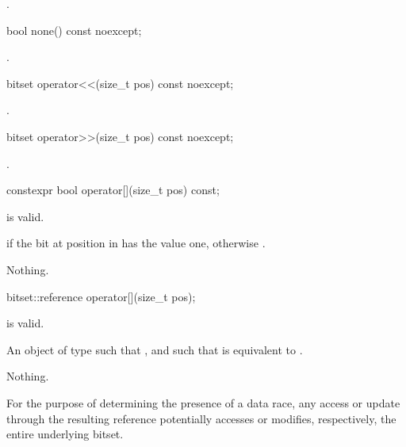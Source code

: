 \begin{itemdescr}
\pnum
\returns
{}.
\end{itemdescr}

%
\begin{itemdecl}
bool none() const noexcept;
\end{itemdecl}

\begin{itemdescr}
\pnum
\returns
{}.
\end{itemdescr}

%
\begin{itemdecl}
bitset operator<<(size_t pos) const noexcept;
\end{itemdecl}

\begin{itemdescr}
\pnum
\returns
{}.
\end{itemdescr}

%
\begin{itemdecl}
bitset operator>>(size_t pos) const noexcept;
\end{itemdecl}

\begin{itemdescr}
\pnum
\returns
{}.
\end{itemdescr}

%
\begin{itemdecl}
constexpr bool operator[](size_t pos) const;
\end{itemdecl}

\begin{itemdescr}
\pnum
\expects
{} is valid.

\pnum
\returns
{} if the bit at position  in  has the value
one, otherwise .

\pnum
\throws
Nothing.
\end{itemdescr}

%
\begin{itemdecl}
bitset::reference operator[](size_t pos);
\end{itemdecl}

\begin{itemdescr}
\pnum
\expects
{} is valid.

\pnum
\returns
An object of type
such that
,
and such that
is equivalent to
.

\pnum
\throws
Nothing.

\pnum
\remarks
For the purpose of determining the presence of a data
race, any access or update through the resulting
reference potentially accesses or modifies, respectively, the entire
underlying bitset.
\end{itemdescr}

